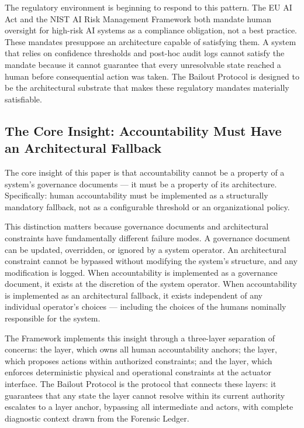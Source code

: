 The regulatory environment is beginning to respond to this pattern. The EU AI Act and the NIST AI Risk Management Framework both mandate human oversight for high-risk AI systems as a compliance obligation, not a best practice. These mandates presuppose an architecture capable of satisfying them. A system that relies on confidence thresholds and post-hoc audit logs cannot satisfy the mandate because it cannot guarantee that every unresolvable state reached a human before consequential action was taken. The Bailout Protocol is designed to be the architectural substrate that makes these regulatory mandates materially satisfiable.

\subsection*{The Core Insight: Accountability Must Have an Architectural Fallback}
\label{sec:intro:core-insight}

The core insight of this paper is that accountability cannot be a property of a system's governance documents — it must be a property of its architecture. Specifically: human accountability must be implemented as a structurally mandatory fallback, not as a configurable threshold or an organizational policy.

This distinction matters because governance documents and architectural constraints have fundamentally different failure modes. A governance document can be updated, overridden, or ignored by a system operator. An architectural constraint cannot be bypassed without modifying the system's structure, and any modification is logged. When accountability is implemented as a governance document, it exists at the discretion of the system operator. When accountability is implemented as an architectural fallback, it exists independent of any individual operator's choices — including the choices of the humans nominally responsible for the system.

The \bxthree Framework implements this insight through a three-layer separation of concerns: the \purpose layer, which owns all human accountability anchors; the \bounds layer, which proposes actions within authorized constraints; and the \fact layer, which enforces deterministic physical and operational constraints at the actuator interface. The Bailout Protocol is the protocol that connects these layers: it guarantees that any state the \bounds layer cannot resolve within its current authority escalates to a \purpose layer anchor, bypassing all intermediate \bounds and \fact actors, with complete diagnostic context drawn from the Forensic Ledger.

